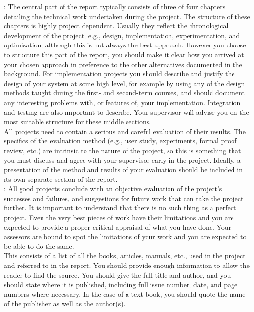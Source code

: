 : The central part of the report typically consists of three of four chapters detailing the technical work undertaken during the project. The structure of these chapters is highly project dependent. Usually they reflect the chronological development of the project, e.g., design, implementation, experimentation, and optimisation, although this is not always the best approach. However you choose to structure this part of the report, you should make it clear how you arrived at your chosen approach in preference to the other alternatives documented in the background. For implementation projects you should describe and justify the design of your system at some high level, for example by using any of the design methods taught during the first- and second-term courses, and should document any interesting problems with, or features of, your implementation. Integration and testing are also important to describe. Your supervisor will advise you on the most suitable structure for these middle sections.\\

 All projects need to contain a serious and careful evaluation of their results. The specifics of the evaluation method (e.g., user study, experiments, formal proof review, etc.) are intrinsic to the nature of the project, so this is something that you must discuss and agree with your supervisor early in the project. Ideally, a presentation of the method and results of your evaluation should be included in its own separate section of the report.\\

: All good projects conclude with an objective evaluation of the project's successes and failures, and suggestions for future work that can take the project further. It is important to understand that there is no such thing as a perfect project. Even the very best pieces of work have their limitations and you are expected to provide a proper critical appraisal of what you have done. Your assessors are bound to spot the limitations of your work and you are expected to be able to do the same.\\

 This consists of a list of all the books, articles, manuals, etc., used in the project and referred to in the report. You should provide enough information to allow the reader to find the source. You should give the full title and author, and you should state where it is published, including full issue number, date, and page numbers where necessary. In the case of a text book, you should quote the name of the publisher as well as the author(s).\\

